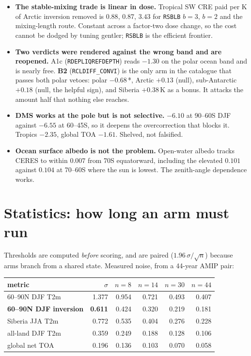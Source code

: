 \documentclass[10pt]{article}
\begin{document}
\begin{itemize}\itemsep1pt
\item \textbf{The stable-mixing trade is linear in dose.} Tropical SW CRE paid per K of
Arctic inversion removed is $0.88$, $0.87$, $3.43$ for \texttt{RSBLB} $b{=}3$, $b{=}2$ and
the mixing-length route. Constant across a factor-two dose change, so the cost cannot be
dodged by tuning gentler; \texttt{RSBLB} is the efficient frontier.
\item \textbf{Two verdicts were rendered against the wrong band and are reopened.} A1c
(\texttt{RDEPLIQREFDEPTH}) reads $-1.30$ on the polar ocean band and is nearly free.
\textbf{B2} (\texttt{RCLDIFF\_CONVI}) is the only arm in the catalogue that passes both
polar vetoes: polar $-0.68$\,*, Arctic $+0.13$ (null), sub-Antarctic $+0.18$ (null, the
helpful sign), and Siberia $+0.38$\,K as a bonus. It attacks the amount half that nothing
else reaches.
\item \textbf{DMS works at the pole but is not selective.} $-6.10$ at 90--60S DJF against
$-6.55$ at 60--45S, so it deepens the overcorrection that blocks it. Tropics $-2.35$,
global TOA $-1.61$. Shelved, not falsified.
\item \textbf{Ocean surface albedo is not the problem.} Open-water albedo tracks CERES to
within $0.007$ from 70S equatorward, including the elevated $0.101$ against $0.104$ at
70--60S where the sun is lowest. The zenith-angle dependence works.
\end{itemize}

\section{Statistics: how long an arm must run}\label{sec:stats}
Thresholds are computed \emph{before} scoring, and are paired
($1.96\,\sigma/\sqrt{n}$) because arms branch from a shared state. Measured noise, from a
44-year AMIP pair:

\begin{center}\small
\begin{tabular}{lrrrrr}
\toprule
metric & $\sigma$ & $n{=}8$ & $n{=}14$ & $n{=}30$ & $n{=}44$ \\
\midrule
60--90N DJF T2m & 1.377 & 0.954 & 0.721 & 0.493 & 0.407 \\
\textbf{60--90N DJF inversion} & \textbf{0.611} & 0.424 & 0.320 & 0.219 & 0.181 \\
Siberia JJA T2m & 0.772 & 0.535 & 0.404 & 0.276 & 0.228 \\
all-land DJF T2m & 0.359 & 0.249 & 0.188 & 0.128 & 0.106 \\
global net TOA & 0.196 & 0.136 & 0.103 & 0.070 & 0.058 \\
\bottomrule
\end{tabular}
\end{center}
\end{document}
